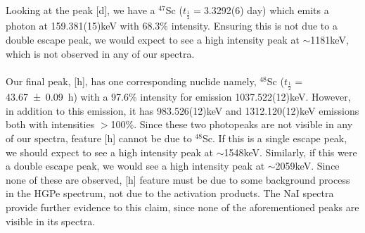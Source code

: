 \documentclass[]{article}
\begin{document}
Looking at the peak [d], we have a ${}^{47}$Sc ($t_{\frac{1}{2}}=$3.3292(6) day) which emits a photon at 159.381(15)keV with 68.3$\%$ intensity. Ensuring this is not due to a double escape peak, we would expect to see a high intensity peak at $\sim$1181keV, which is not observed in any of our spectra.\\\\
Our final peak, [h], has one corresponding nuclide namely, ${}^{48}$Sc ($t_{\frac{1}{2}}=$\SI{43.67(9)}{\hour}) with a 97.6$\%$ intensity for emission 1037.522(12)keV. However, in addition to this emission, it has 983.526(12)keV and 1312.120(12)keV emissions both with intensities $>$100$\%$. Since these two photopeaks are not visible in any of our spectra, feature [h] cannot be due to ${}^{48}$Sc. If this is a single escape peak, we should expect to see a high intensity peak at $\sim$1548keV. Similarly, if this were a double escape peak, we would see a high intensity peak at $\sim$2059keV. Since none of these are observed, [h] feature must be due to some background process in the HGPe spectrum, not due to the activation products. The NaI spectra provide further evidence to this claim, since none of the aforementioned peaks are visible in its spectra.
\pagebreak
\end{document}
